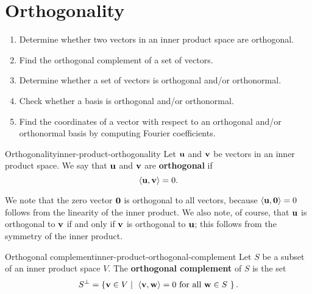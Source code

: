 \section{Orthogonality}

\begin{outcome}
  \begin{enumerate}
  \item Determine whether two vectors in an inner product space are
    orthogonal.
  \item Find the orthogonal complement of a set of vectors.
  \item Determine whether a set of vectors is orthogonal and/or orthonormal.
  \item Check whether a basis is orthogonal and/or orthonormal.
  \item Find the coordinates of a vector with respect to an orthogonal
    and/or orthonormal basis by computing Fourier coefficients.
  \end{enumerate}
\end{outcome}

\begin{definition}{Orthogonality}{inner-product-orthogonality}
  Let $\vect{u}$ and $\vect{v}$ be vectors in an inner product space.
  We say that $\vect{u}$ and $\vect{v}$ are \textbf{orthogonal}%
   if
  \begin{equation*}
    \iprod{\vect{u}, \vect{v}} = 0.
  \end{equation*}
\end{definition}

We note that the zero vector $\vect{0}$ is orthogonal to all vectors,
because $\iprod{\vect{u},\vect{0}} = 0$ follows from the linearity of
the inner product. We also note, of course, that $\vect{u}$ is
orthogonal to $\vect{v}$ if and only if $\vect{v}$ is orthogonal to
$\vect{u}$; this follows from the symmetry of the inner product.

\begin{definition}{Orthogonal complement}{inner-product-orthogonal-complement}
  Let $S$ be a subset of an inner product space $V$. The
  \textbf{orthogonal complement}%
   of $S$ is the set
  \begin{equation*}
    S^{\perp} = \set{\vect{v}\in V \mid
      \mbox{
        $\iprod{\vect{v},\vect{w}} = 0$ for all $\vect{w}\in S$
      }}.
  \end{equation*}
\end{definition}

